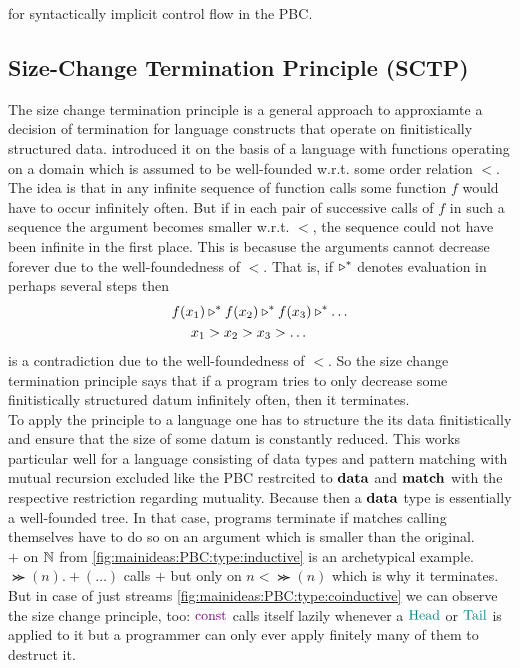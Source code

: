 for syntactically implicit control flow in the PBC.

\subsection{Size-Change Termination Principle (SCTP)}
\label{sec:mainideas:sctp}

The size change termination principle is a general approach to approxiamte a decision of termination for language constructs that operate on finitistically structured data.
\cite{10.1145/373243.360210} introduced it on the basis of a language with functions operating on a domain which is assumed to be well-founded w.r.t. some order relation $<$.
The idea is that in any infinite sequence of function calls some function $f$ would have to occur infinitely often.
But if in each pair of successive calls of $f$ in such a sequence the argument becomes smaller w.r.t. $<$, the sequence could not have been infinite in the first place.
This is becasuse the arguments cannot decrease forever due to the well-foundedness of $<$.
That is, if $\triangleright^{\ast}$ denotes evaluation in perhaps several steps then
\begin{align*}
  f(x_{1})
  &\triangleright^{\ast}
  f(x_{2})
  \triangleright^{\ast}
  f(x_{3})
  \triangleright^{\ast}
  \ldots
  \\
  x_{1}
  &>
  x_{2}
  >
  x_{3}
  >
  \ldots
\end{align*}
is a contradiction due to the well-foundedness of $<$.
So the size change termination principle says that if a program tries to only decrease some finitistically structured datum infinitely often, then it terminates.
\\
To apply the principle to a language one has to structure the its data finitistically and ensure that the size of some datum is constantly reduced.
This works particular well for a language consisting of data types and pattern matching with mutual recursion excluded like the PBC restrcited to $\mathbf{data}$ and $\mathbf{match}$ with the respective restriction regarding mutuality.
Because then a $\mathbf{data}$ type is essentially a well-founded tree.
In that case, programs terminate if matches calling themselves have to do so on an argument which is smaller than the original.
\\
$\plus$ on $\Nat$ from \cref{fig:mainideas:PBC:type:inductive} is an archetypical example.
$\Succ(n).\plus(\ldots)$ calls $\plus$ but only on $n < \Succ(n)$ which is why it terminates.
\\
But in case of just streams \cref{fig:mainideas:PBC:type:coinductive} we can observe the size change principle, too: $\const$ calls itself lazily whenever a $\Head$ or $\Tail$ is applied to it but a programmer can only ever apply finitely many of them to destruct it.
